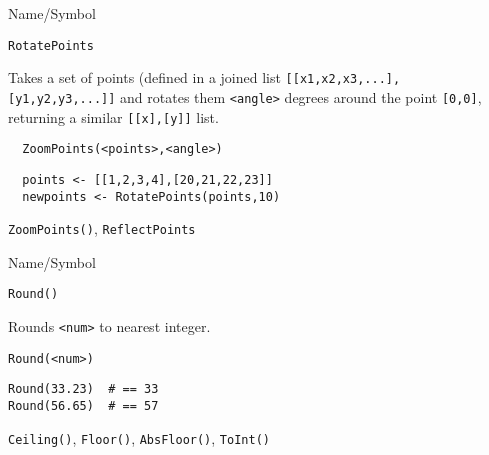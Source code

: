 \begin{desc}{Name/Symbol}
\item[Name/Symbol]	\verb+RotatePoints+

\item[Description]  Takes a set of points (defined in a joined list 
\verb+[[x1,x2,x3,...],+ \verb+[y1,y2,y3,...]]+ and rotates them \verb+<angle>+ degrees
around the point \verb+[0,0]+,  returning a similar \verb+[[x],[y]]+ list.

\item[Usage]
\begin{verbatim}
  ZoomPoints(<points>,<angle>)
\end{verbatim}

\item[Example] 
\begin{verbatim}
  points <- [[1,2,3,4],[20,21,22,23]]
  newpoints <- RotatePoints(points,10)
\end{verbatim}

\item[See Also] \verb+ZoomPoints()+, \verb+ReflectPoints+
\end{desc}


\begin{desc}{Name/Symbol}
\item[Name/Symbol] 	\verb+Round()+

\item[Description] 	Rounds \verb+<num>+ to nearest integer.

\item[Usage]        	
\begin{verbatim}
Round(<num>)
\end{verbatim}

\item[Example]
\begin{verbatim}
Round(33.23)  # == 33
Round(56.65)  # == 57
\end{verbatim}

\item[See Also]     	\verb+Ceiling()+, \verb+Floor()+, \verb+AbsFloor()+, \verb+ToInt()+
\end{desc}

\vfill
\newpage
{}
\vfill


